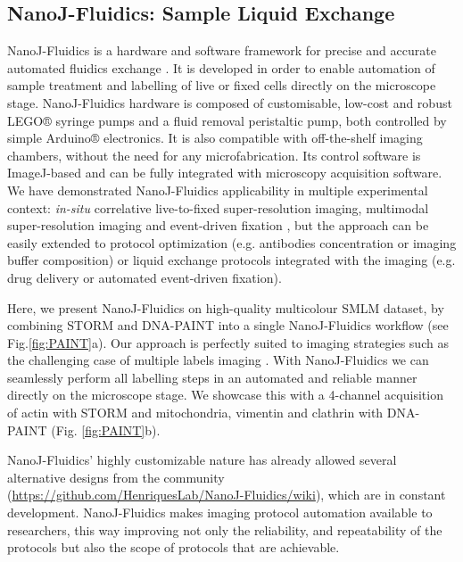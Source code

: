 \subsection*{NanoJ-Fluidics: Sample Liquid Exchange}
NanoJ-Fluidics is a hardware and software framework for precise and accurate automated fluidics exchange \cite{almada2018automating}. It is developed in order to enable automation of sample treatment and labelling of live or fixed cells directly on the microscope stage. NanoJ-Fluidics hardware is composed of customisable, low-cost and robust LEGO® syringe pumps and a fluid removal peristaltic pump, both controlled by simple Arduino® electronics. It is also compatible with off-the-shelf imaging chambers, without the need for any microfabrication. Its control software is ImageJ-based and can be fully integrated with microscopy acquisition software. We have demonstrated NanoJ-Fluidics applicability in multiple experimental context: \textit{in-situ} correlative live-to-fixed super-resolution imaging, multimodal super-resolution imaging and event-driven fixation \cite{almada2018automating}, but the approach can be easily  extended to protocol optimization (e.g. antibodies concentration or imaging buffer composition) or liquid exchange protocols integrated with the imaging (e.g. drug delivery or automated event-driven fixation).

Here, we present NanoJ-Fluidics on high-quality multicolour SMLM dataset, by combining STORM and DNA-PAINT \cite{jungmann2014multiplexed} into a single NanoJ-Fluidics workflow (see Fig.\ref{fig:PAINT}a). Our approach is perfectly suited to imaging strategies such as the challenging case of multiple labels imaging \cite{dempsey2011evaluation}. With NanoJ-Fluidics we can seamlessly perform all labelling steps in an automated and reliable manner directly on the microscope stage. We showcase this with a 4-channel acquisition of actin with STORM and mitochondria, vimentin and clathrin with DNA-PAINT (Fig. \ref{fig:PAINT}b). 

NanoJ-Fluidics' highly customizable nature has already allowed several alternative designs from the community (\href{https://github.com/HenriquesLab/NanoJ-Fluidics/wiki}{https://github.com/HenriquesLab/NanoJ-Fluidics/wiki}), which are in constant development. NanoJ-Fluidics makes imaging protocol automation available to researchers, this way improving not only the reliability, and repeatability of the protocols but also the scope of protocols that are achievable.  

